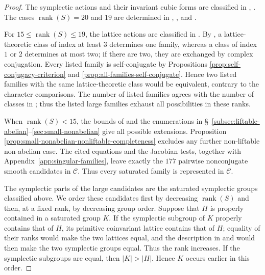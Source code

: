 \documentclass[12pt]{amsart}
\numberwithin{equation}{section}
\theoremstyle{plain}
\theoremstyle{definition}
\theoremstyle{remark}
\DeclareMathOperator{\rank}{rank}
\begin{document}
\begin{proof}
The symplectic actions and their invariant cubic forms are classified in
\cite{laza2022automorphisms}, \cite{KOIKE202512,KOIKE2026}.  The cases
$\rank(S)=20$ and $19$ are determined in
\cite[Theorem~1.8 and Proposition~6.12]{laza2022automorphisms},
\cite[Theorem~1.2 and \S6]{FWZ26}, and \cite[\S6.1.1]{FZ26}.

For $15\leq\rank(S)\leq19$, the lattice actions are classified in
\cite[Theorem~1.1 and Table~1]{FZ26}.  By
\cite[Proposition~3.6]{FZ26}, a lattice-theoretic class of index at least
$3$ determines one family, whereas a class of index $1$ or $2$ determines
at most two; if there are two, they are exchanged by complex conjugation.
Every listed family is self-conjugate by Propositions
\ref{prop:self-conjugacy-criterion} and
\ref{prop:all-families-self-conjugate}.  Hence two listed families with the
same lattice-theoretic class would be equivalent, contrary to the character
comparisons.  The number of listed families agrees with the number of classes
in \cite[Table~1]{FZ26}; thus the listed large families exhaust all
possibilities in these ranks.

When $\rank(S)<15$, the bounds of
\cite{yang2024automorphism} and the enumerations in
\S~\ref{subsec:liftable-abelian}--\ref{sec:small-nonabelian} give all
possible extensions.  Proposition
\ref{prop:small-nonabelian-nonliftable-completeness} excludes any further
non-liftable non-abelian case.  The cited equations and the Jacobian tests,
together with Appendix~\ref{app:singular-families}, leave exactly the $177$
pairwise nonconjugate smooth candidates in $\mathscr C$.  Thus every
saturated family is represented in $\mathscr C$.

The symplectic parts of the large candidates are the saturated symplectic
groups classified above.  We order these candidates first by decreasing
$\rank(S)$ and then, at a fixed rank, by decreasing group order.  Suppose
that $H$ is properly contained in a saturated group $K$.  If the symplectic
subgroup of $K$ properly contains that of $H$, its primitive coinvariant
lattice contains that of $H$; equality of their ranks would make the two
lattices equal, and the description in \cite[\S4.1]{FZ26} and
\cite{laza2022automorphisms} would then make the two symplectic groups equal.
Thus the rank increases.  If the symplectic subgroups are equal, then
$|K|>|H|$.  Hence $K$ occurs earlier in this order.


\end{proof}
\end{document}
